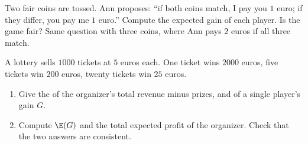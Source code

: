 \begin{exercise}[$\star\star$]\label{exo:g11:prob:10}
Two fair coins are tossed. Ann proposes: ``if both coins match, I pay you
$1$ euro; if they differ, you pay me $1$ euro.'' Compute the expected
gain of each player. Is the game fair? Same question with three coins,
where Ann pays $2$ euros if all three match.
\end{exercise}

\begin{exercise}[$\star\star\star$]\label{exo:g11:prob:11}
A lottery sells $1000$ tickets at $5$ euros each. One ticket wins
$2000$ euros, five tickets win $200$ euros, twenty tickets win $25$
euros.
\begin{enumerate}
  \item Give the  of the organizer's total revenue minus
        prizes, and of a single player's gain $G$.
  \item Compute $\E(G)$ and the total expected profit of the organizer.
        Check that the two answers are consistent.
\end{enumerate}
\end{exercise}
